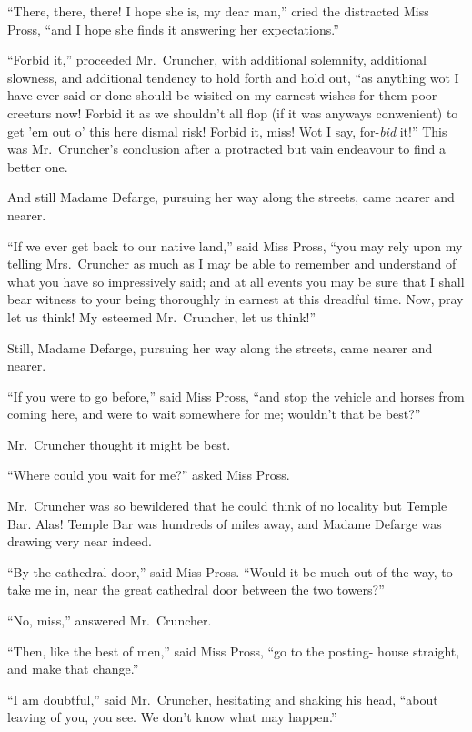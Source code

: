 ``There, there, there!  I hope she is, my dear man,'' cried the distracted
Miss Pross, ``and I hope she finds it answering her expectations.''

``Forbid it,'' proceeded Mr.\ Cruncher, with additional solemnity,
additional slowness, and additional tendency to hold forth and hold
out, ``as anything wot I have ever said or done should be wisited on
my earnest wishes for them poor creeturs now!  Forbid it as we shouldn't
all flop (if it was anyways conwenient) to get 'em out o' this here
dismal risk!  Forbid it, miss!  Wot I say, for-\emph{bid} it!''  This was
Mr.\ Cruncher's conclusion after a protracted but vain endeavour
to find a better one.

And still Madame Defarge, pursuing her way along the streets, came
nearer and nearer.

``If we ever get back to our native land,'' said Miss Pross, ``you may
rely upon my telling Mrs.\ Cruncher as much as I may be able to remember
and understand of what you have so impressively said; and at all
events you may be sure that I shall bear witness to your being
thoroughly in earnest at this dreadful time.  Now, pray let us think!
My esteemed Mr.\ Cruncher, let us think!''

Still, Madame Defarge, pursuing her way along the streets, came
nearer and nearer.

``If you were to go before,'' said Miss Pross, ``and stop the vehicle
and horses from coming here, and were to wait somewhere for me;
wouldn't that be best?''

Mr.\ Cruncher thought it might be best.

``Where could you wait for me?'' asked Miss Pross.

Mr.\ Cruncher was so bewildered that he could think of no locality but
Temple Bar.  Alas!  Temple Bar was hundreds of miles away, and Madame
Defarge was drawing very near indeed.

``By the cathedral door,'' said Miss Pross.  ``Would it be much out of the
way, to take me in, near the great cathedral door between the two towers?''

``No, miss,'' answered Mr.\ Cruncher.

``Then, like the best of men,'' said Miss Pross, ``go to the posting-%
house straight, and make that change.''

``I am doubtful,'' said Mr.\ Cruncher, hesitating and shaking his head,
``about leaving of you, you see.  We don't know what may happen.''


